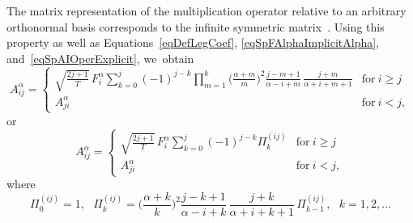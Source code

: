 \documentclass[10pt,reqno]{amsart}
\theoremstyle{plain}
\theoremstyle{remark}
\begin{document}
The matrix representation of the multiplication operator relative to an arbitrary orthonormal basis corresponds to the infinite symmetric matrix~\cite{SolSemPeshNed_79}. Using this property as well as Equations~\eqref{eqDefLegCoef}, \eqref{eqSpFAlphaImplicitAlpha}, and~\eqref{eqSpAIOperExplicit}, we~obtain
\begin{equation}\label{eqSpAOperAlphaExplicitSafe1}
  A_{ij}^\alpha = \left\{
    \begin{array}{ll}
      \displaystyle \sqrt{\frac{2j+1}{T}} \, F_i^\alpha \sum\limits_{k=0}^j (-1)^{j-k} \prod\limits_{m=1}^k \biggl( \frac{\alpha+m}{m} \biggr)^2 \frac{j-m+1}{\alpha-i+m} \, \frac{j+m}{\alpha+i+m+1} & \text{for} ~ i \geqslant j \\
      A_{ji}^\alpha & \text{for} ~ i < j,
    \end{array}
  \right.
\end{equation}
or
\begin{equation}\label{eqSpAOperAlphaExplicitSafe2}
  A_{ij}^\alpha = \left\{
    \begin{array}{ll}
      \displaystyle \sqrt{\frac{2j+1}{T}} \, F_i^\alpha \sum\limits_{k=0}^j (-1)^{j-k} \Pi_k^{(ij)} & \text{for} ~ i \geqslant j \\
      A_{ji}^\alpha & \text{for} ~ i < j,
    \end{array}
  \right.
\end{equation}
where
\[
  \Pi_0^{(ij)} = 1, \ \ \ \Pi_k^{(ij)} = \biggl( \frac{\alpha+k}{k} \biggr)^2 \frac{j-k+1}{\alpha-i+k} \, \frac{j+k}{\alpha+i+k+1} \, \Pi_{k-1}^{(ij)}, \ \ \ k = 1,2,\dots
\]
\end{document}
